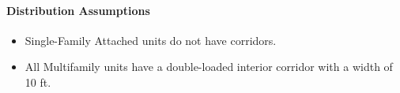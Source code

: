 

\paragraph{Distribution Assumptions}
% 
\begin{itemize}
    \item Single-Family Attached units do not have corridors.
    \item All Multifamily units have a double-loaded interior corridor with a width of 10 ft.
\end{itemize}
